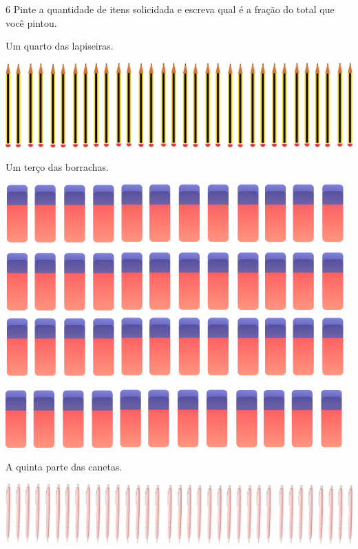 \pagebreak
\num{6} Pinte a quantidade de itens solicidada e escreva qual é a fração do total que você pintou.

\begin{escolha}
\item Um quarto das lapiseiras.

\includegraphics[width=\textwidth]{media/image54.png}


\item  Um terço das borrachas.

\includegraphics[width=\textwidth]{media/image55.png}


\pagebreak
\item A quinta parte das canetas.

\includegraphics[width=\textwidth]{media/image56.png}


\end{escolha}
